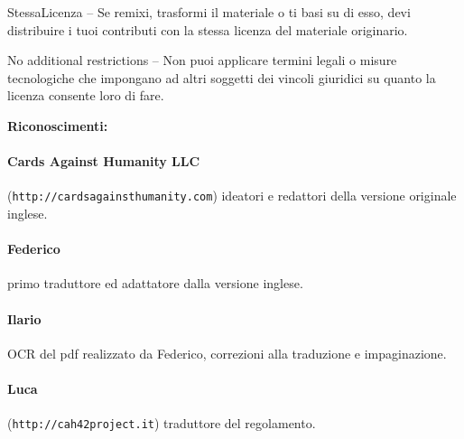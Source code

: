 \documentclass[a4paper,12pt]{article}
\begin{document}
    StessaLicenza -- Se remixi, trasformi il materiale o ti basi su di esso, devi distribuire i tuoi contributi con la stessa licenza del materiale originario.
\indent

    No additional restrictions -- Non puoi applicare termini legali o misure tecnologiche che impongano ad altri soggetti dei vincoli giuridici su quanto la licenza consente loro di fare.

\bigskip\bigskip

\begin{center}\bf{Riconoscimenti:}\end{center}

\paragraph{Cards Against Humanity LLC} (\texttt{http://cardsagainsthumanity.com}) ideatori e redattori della versione originale inglese.

\paragraph{Federico} primo traduttore ed adattatore dalla versione inglese.

\paragraph{Ilario} OCR del pdf realizzato da Federico, correzioni alla traduzione e impaginazione.

\paragraph{Luca} (\texttt{http://cah42project.it}) traduttore del regolamento.
\end{document}
